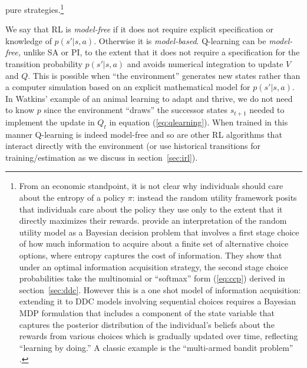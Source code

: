 pure strategies.\footnote{\footnotesize From an economic standpoint, it is not clear why individuals
should care about the entropy of a policy $\pi$: instead the random utility framework posits that
individuals care about the policy they use only to the extent that it directly maximizes their rewards.  
\citet{matejka:2015} provide an interpretation of the random utility model as a Bayesian decision problem
that involves a first stage choice of how much information to acquire about a finite set of alternative
choice options, where entropy captures the cost of information. They show that under an optimal
information acquisition strategy, the second stage choice probabilities take the multinomial or
``softmax'' form (\ref{eq:ccp}) derived in section~\ref{sec:ddc}. However this is a one shot model
of information acquisition: extending it to  DDC models involving sequential 
choices requires a Bayesian MDP formulation that includes
a component of the state variable that captures the posterior distribution of the individual's beliefs about the rewards
from various choices which is gradually updated over time, reflecting ``learning by doing.'' A classic example is the
``multi-armed bandit problem'' \citet{gittins:1974}.}



We say that RL is \textit{model-free} if it does not require explicit specification or knowledge of $p(s'|s,a)$.
Otherwise it is \textit{model-based}.  Q-learning can be  {\it model-free,\/}  unlike SA or PI, to the
extent that it does not require a specification for the
transition probability $p(s'|s,a)$ and avoids numerical integration to update $V$ and $Q$. This is possible
when ``the environment'' generates new states  rather than a computer simulation based on an explicit 
mathematical model for $p(s'|s,a)$. In  Watkins'  example
of an animal learning to adapt and thrive, we do not need to know $p$ since the environment ``draws'' the successor states
$s_{t+1}$ needed to implement the update in $Q_t$ in equation (\ref{eq:qlearning}). When trained in this manner Q-learning is indeed model-free
and so are other RL algorithms that interact directly with the environment (or use historical transitions for training/estimation as we discuss
in section~\ref{sec:irl}).

